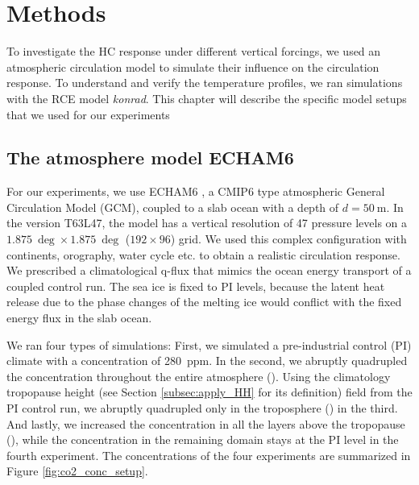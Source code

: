 \chapter{Methods}
\label{sec:setup}
To investigate the HC response under different vertical \CO forcings, we used an atmospheric circulation model to simulate their influence on the circulation response. To understand and verify the temperature profiles, we ran simulations with the RCE model \textit{konrad}. This chapter will describe the specific model setups that we used for our experiments
\section{The atmosphere model ECHAM6} \label{subsec:meth_ECHAM}
For our experiments, we use ECHAM6 \parencite{stevensAtmosphericComponentMPIM2013}, a CMIP6 type atmospheric General Circulation Model (GCM), coupled to a slab ocean with a depth of $d=\SI{50}{\m}$. In the version T63L47, the model has a vertical resolution of 47 pressure levels on a $\SI{1.875}{\deg}\times\SI{1.875}{\deg}$ ($192\times96$) grid.
We used this complex configuration with continents, orography, water cycle etc. to obtain a realistic circulation response.
We prescribed a climatological q-flux that mimics the ocean energy transport of a coupled control run. The sea ice is fixed to PI levels, because the latent heat release due to the phase changes of the melting ice would conflict with the fixed energy flux in the slab ocean.

We ran four types of simulations: First, we simulated a pre-industrial control (PI) climate with a \CO concentration of \SI{280}{ppm}. In the second, we abruptly quadrupled the \CO{} concentration throughout the entire atmosphere (\uniform). Using the climatology tropopause height (see Section \ref{subsec:apply_HH} for its definition) field from the PI control run, we abruptly quadrupled \CO{} only in the troposphere (\tropo) in the third. And lastly, we increased the \CO{} concentration in all the layers above the tropopause (\strato), while the \CO{} concentration in the remaining domain stays at the PI level in the fourth experiment. The \CO{} concentrations of the four experiments are summarized in Figure \ref{fig:co2_conc_setup}.

